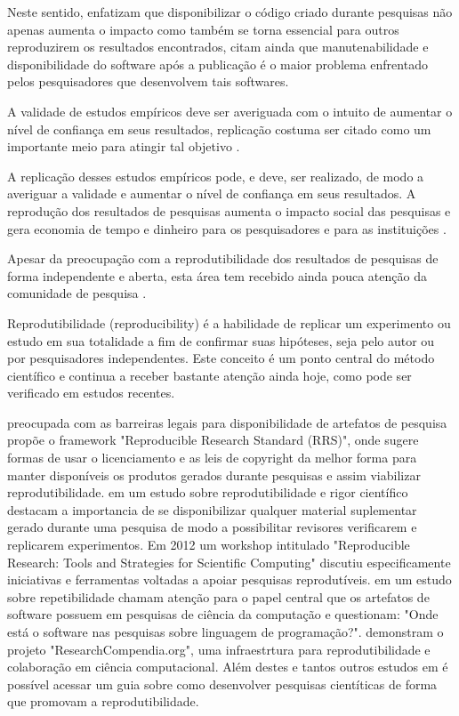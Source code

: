 Neste sentido,  enfatizam que disponibilizar o código
criado durante pesquisas não apenas aumenta o impacto como também se torna
essencial para outros reproduzirem os resultados encontrados, citam ainda que
manutenabilidade e disponibilidade do software após a publicação é o maior
problema enfrentado pelos pesquisadores que desenvolvem tais softwares.

A validade de estudos empíricos deve ser averiguada com o intuito
de aumentar o nível de confiança em seus resultados, replicação costuma ser
citado como um importante meio para atingir tal objetivo \cite{Almqvist2006}.

A replicação desses estudos empíricos pode, e deve, ser realizado, de modo a
averiguar a validade e aumentar o nível de confiança em seus resultados. A
reprodução dos resultados de pesquisas aumenta o impacto social das pesquisas e
gera economia de tempo e dinheiro para os pesquisadores e para as instituições
\cite{Nesta2010}.

Apesar da preocupação com a reprodutibilidade dos
resultados de pesquisas de forma independente \cite{Stodden2009} e aberta,
esta área tem recebido ainda pouca atenção da comunidade de pesquisa
\cite{Nancy2015, Grand2010Open}.

Reprodutibilidade (reproducibility) é a habilidade de replicar um experimento
ou estudo em sua totalidade a fim de confirmar suas hipóteses, seja pelo
autor ou por pesquisadores independentes. Este conceito é um ponto
central do método científico e continua a receber bastante atenção ainda hoje,
como pode ser verificado em estudos recentes.

 preocupada com as barreiras legais para
disponibilidade de artefatos de pesquisa propõe o framework "Reproducible
Research Standard (RRS)", onde sugere formas de usar o licenciamento e as leis
de copyright da melhor forma para manter disponíveis os produtos gerados
durante pesquisas e assim viabilizar reprodutibilidade. 
em um estudo sobre reprodutibilidade e rigor científico destacam a importancia
de se disponibilizar qualquer material suplementar gerado durante uma pesquisa
de modo a possibilitar revisores verificarem e replicarem experimentos. Em
2012 um workshop intitulado "Reproducible Research: Tools and Strategies for
Scientific Computing" \cite{Stodden2012} discutiu especificamente iniciativas
e ferramentas voltadas a apoiar pesquisas reprodutíveis.
 em um estudo sobre repetibilidade chamam
atenção para o papel central que os artefatos de software possuem em pesquisas
de ciência da computação e questionam: "Onde está o software nas pesquisas
sobre linguagem de programação?".  demonstram o
projeto "ResearchCompendia.org", uma infraestrtura para reprodutibilidade e
colaboração em ciência computacional. Além destes e tantos outros estudos em
\cite{GithubReproducibilityGuide} é possível acessar um guia sobre como
desenvolver pesquisas cientíticas de forma que promovam a reprodutibilidade.

